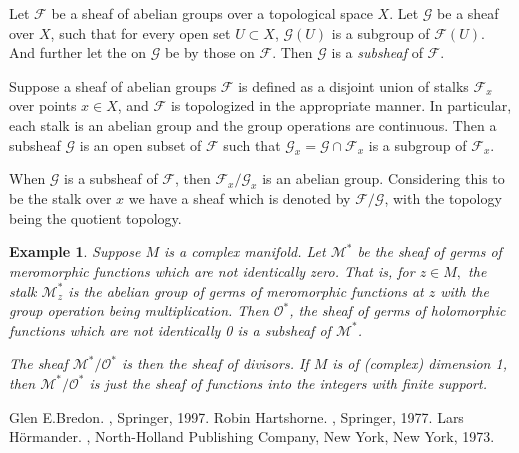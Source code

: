 \documentclass[12pt]{article}
\theoremstyle{theorem}
\newtheorem*{example}{Example}
\theoremstyle{definition}
\theoremstyle{remark}
\begin{document}
Let $\mathcal{F}$ be a sheaf of abelian groups  over a topological space $X$.  Let $\mathcal{G}$ be a sheaf
over $X$, such that for every open set $U \subset X$, $\mathcal{G}(U)$ is a subgroup of
$\mathcal{F}(U)$.  And further let the  on $\mathcal{G}$ be  by those on $\mathcal{F}$.
Then $\mathcal{G}$ is a \emph{subsheaf} of $\mathcal{F}$.

Suppose a sheaf of abelian groups $\mathcal{F}$ is defined as a disjoint union of stalks $\mathcal{F}_x$ over points $x \in X$, and $\mathcal{F}$ is topologized in the appropriate manner.
In particular, each stalk is an abelian group and the group operations are continuous.
Then a subsheaf $\mathcal{G}$ is an open subset of $\mathcal{F}$ such that $\mathcal{G}_x = 
\mathcal{G} \cap \mathcal{F}_x$ is a subgroup of $\mathcal{F}_x$.

When $\mathcal{G}$ is a subsheaf of $\mathcal{F}$, then 
$\mathcal{F}_x / \mathcal{G}_x$ is an abelian group.  Considering this to be the stalk over $x$
we have a sheaf which is denoted by $\mathcal{F}/\mathcal{G}$, with the topology being the quotient topology.

\begin{example}
Suppose $M$ is a complex manifold.
Let $\mathcal{M}^*$ be the sheaf of germs of meromorphic functions which are not identically zero.  That is, for $z \in M,$ the stalk $\mathcal{M}^*_z$ is the abelian group of germs of meromorphic functions at $z$ with the group operation being multiplication.
Then $\mathcal{O}^*$, the sheaf
of germs of holomorphic functions which are not identically 0 is a subsheaf
of $\mathcal{M}^*$.

The sheaf $\mathcal{M}^* / \mathcal{O}^*$ is then the sheaf of divisors.  If $M$ is of (complex) dimension 1, then
$\mathcal{M}^* / \mathcal{O}^*$ is just the sheaf of functions into the integers with finite support.
\end{example}

\begin{thebibliography}{9}
Glen E.\@ Bredon.
{\em {}},
Springer, 1997.
Robin Hartshorne.
{\em {}},
Springer, 1977.
Lars H\"ormander.
{\em {}},
North-Holland Publishing Company, New York, New York, 1973.
\end{thebibliography}
\end{document}
